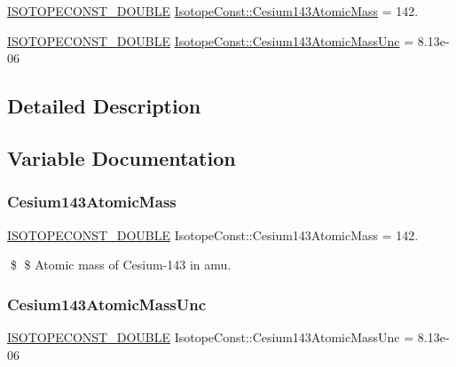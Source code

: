 \begin{DoxyCompactItemize}
\item 
\mbox{\hyperlink{group___isotope_const-_macros_ga8f45a7272ce02c0b4c65c44636ed719a}{I\+S\+O\+T\+O\+P\+E\+C\+O\+N\+S\+T\+\_\+\+D\+O\+U\+B\+LE}} \mbox{\hyperlink{group___isotope_const-_cesium-_cs143_ga1bfea1052ca01a828d4af100eb0f77f2}{Isotope\+Const\+::\+Cesium143\+Atomic\+Mass}} = 142.
\item 
\mbox{\hyperlink{group___isotope_const-_macros_ga8f45a7272ce02c0b4c65c44636ed719a}{I\+S\+O\+T\+O\+P\+E\+C\+O\+N\+S\+T\+\_\+\+D\+O\+U\+B\+LE}} \mbox{\hyperlink{group___isotope_const-_cesium-_cs143_gaf23243b9c2a4362ce8e76980a0bb50da}{Isotope\+Const\+::\+Cesium143\+Atomic\+Mass\+Unc}} = 8.\+13e-\/06
\end{DoxyCompactItemize}


\subsection{Detailed Description}


\subsection{Variable Documentation}
\mbox{\label{group___isotope_const-_cesium-_cs143_ga1bfea1052ca01a828d4af100eb0f77f2}} 
\subsubsection{\texorpdfstring{Cesium143\+Atomic\+Mass}{Cesium143AtomicMass}}
{\footnotesize\ttfamily \mbox{\hyperlink{group___isotope_const-_macros_ga8f45a7272ce02c0b4c65c44636ed719a}{I\+S\+O\+T\+O\+P\+E\+C\+O\+N\+S\+T\+\_\+\+D\+O\+U\+B\+LE}} Isotope\+Const\+::\+Cesium143\+Atomic\+Mass = 142.}

\$ \$ Atomic mass of Cesium-\/143 in amu. \mbox{\label{group___isotope_const-_cesium-_cs143_gaf23243b9c2a4362ce8e76980a0bb50da}} 
\subsubsection{\texorpdfstring{Cesium143\+Atomic\+Mass\+Unc}{Cesium143AtomicMassUnc}}
{\footnotesize\ttfamily \mbox{\hyperlink{group___isotope_const-_macros_ga8f45a7272ce02c0b4c65c44636ed719a}{I\+S\+O\+T\+O\+P\+E\+C\+O\+N\+S\+T\+\_\+\+D\+O\+U\+B\+LE}} Isotope\+Const\+::\+Cesium143\+Atomic\+Mass\+Unc = 8.\+13e-\/06}

